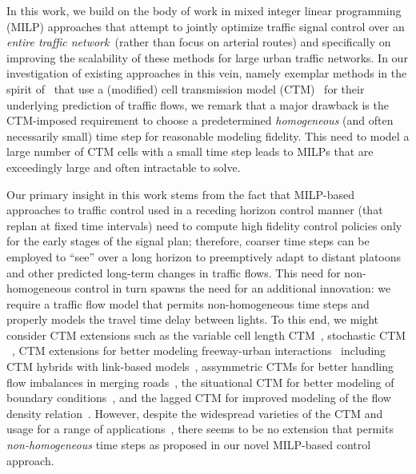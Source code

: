 In this work, we build on the body of work in mixed integer linear
programming (MILP) approaches that attempt to jointly optimize traffic
signal control over an \emph{entire traffic network}~(rather than
focus on arterial routes) and specifically on improving the
scalability of these methods for large urban traffic networks.  In our
investigation of existing approaches in this vein, namely exemplar
methods in the spirit of~
 that
use a (modified) cell transmission model
(CTM)~ for their underlying
prediction of traffic flows, we remark that a major drawback is the
CTM-imposed requirement to choose a predetermined \emph{homogeneous} (and
often necessarily small) time step for reasonable modeling fidelity.
This need to model a large number of CTM cells with a small time step
leads to MILPs that are exceedingly large and often intractable to
solve. %

Our primary insight in this work stems from the fact that MILP-based
approaches to traffic control used in a receding horizon control
manner (that replan at fixed time intervals) need to compute high
fidelity control policies only for the early stages of the signal
plan; therefore, coarser time steps can be employed to ``see'' over a
long horizon to preemptively adapt to distant platoons and other
predicted long-term changes in traffic flows.
This need for non-homogeneous control in
turn spawns the need for an additional innovation: we require a
traffic flow
model that permits non-homogeneous time steps and properly models the
travel time delay between lights.  To this end, we might consider CTM
extensions such as the variable cell length
CTM~, stochastic CTM
~,
CTM extensions for better modeling freeway-urban
interactions~ including CTM hybrids with
link-based models~, assymmetric
CTMs for better handling flow imbalances in merging
roads~, the situational CTM for better
modeling of boundary conditions~, and the
lagged CTM for improved modeling of the flow density
relation~.  However, despite the widespread
varieties of the CTM and usage for a range of
applications~, there seems to be
no extension that permits \emph{non-homogeneous} time steps as proposed in
our novel MILP-based control approach.


